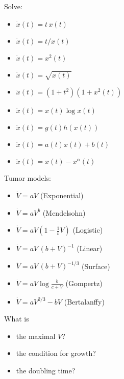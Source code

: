 \documentclass[onepage, 12pt]{beamer}
\begin{document}
\begin{frame}{}{}
    \begin{minipage}{0.49\textwidth}
        Solve:
        \begin{itemize}
        \item
            $\dot{x}(t) = t \, x(t)$
        \item
            $\dot{x}(t) = t / x(t)$
        \item
            $\dot{x}(t) = x^2(t)$
        \item  
            $\dot{x}(t) = \sqrt{ x(t) }$
        \item
            $\dot{x}(t) = (1 + t^2) (1 + x^2(t))$
        \item
            $\dot{x}(t) = x(t) \log x(t)$
        \item
            $\dot{x}(t) = g(t) h(x(t))$
        \item
            $\dot{x}(t) = a(t) x(t) + b(t)$
        \item
            $\dot{x}(t) = x(t) - x^\alpha(t)$
        \end{itemize}
    \end{minipage}
    \hfill
    \begin{minipage}{0.49\textwidth}
        Tumor models:
        \begin{itemize}
        \item 
            $\dot{V} = a V$
            \hfill
            {\scriptsize(Exponential)}
        \item
            $\dot{V} = a V^b$
            \hfill
            {\scriptsize(Mendelsohn)}
        \item
            $\dot{V} = a V (1 - \frac1b V)$
            \hfill
            {\scriptsize(Logistic)}
        \item
            $\dot{V} = a V \, (b + V)^{-1}$
            \hfill
            {\scriptsize(Linear)}
        \item
            $\dot{V} = a V \, (b + V)^{-1/3}$
            \hfill
            {\scriptsize(Surface)}
        \item
            $\dot{V} = a V \log \frac{b}{c + V}$
            \hfill
            {\scriptsize(Gompertz)}
        \item
            $\dot{V} = a V^{2/3} - b V$
            \hfill
            {\scriptsize(Bertalanffy)}
        \end{itemize}
        
        What is
        \begin{itemize}
        \item 
            the maximal $V$?
        \item
            the condition for growth?
        \item
            the doubling time?
        \end{itemize}

    \end{minipage}

\end{frame}
\end{document}
